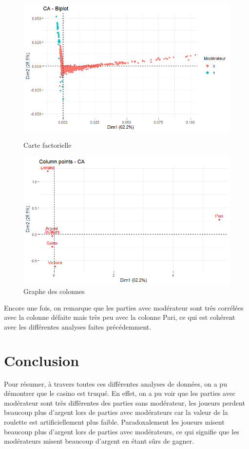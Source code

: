 \documentclass[a4paper, 12pt]{article}
\theoremstyle{exo}
\begin{document}
\begin{figure}[H]
\centering
    \begin{minipage}{0.49\textwidth}
        \centering
        \includegraphics[width=\textwidth]{figures/biplot.png}
        \caption{Carte factorielle}
    \end{minipage}
    \begin{minipage}{0.49\textwidth}
        \centering
        \includegraphics[width=\textwidth]{figures/afc_point.png}
        \caption{Graphe des colonnes}
    \end{minipage}
\end{figure}

Encore une fois, on remarque que les parties avec modérateur sont très corrélées avec la colonne défaite mais très peu avec la colonne Pari, ce qui est cohérent avec les différentes analyses faites précédemment.

\newpage

\section{Conclusion}

Pour résumer, à travers toutes ces différentes analyses de données, on a pu démontrer que le casino est truqué. En effet, on a pu voir que les parties avec modérateur sont très différentes des parties sans modérateur, les joueurs perdent beaucoup plus d'argent lors de parties avec modérateurs car la valeur de la roulette est artificiellement plus faible. Paradoxalement les joueurs misent beaucoup plus d'argent lors de parties avec modérateurs, ce qui signifie que les modérateurs misent beaucoup d'argent en étant sûrs de gagner.  
\end{document}

